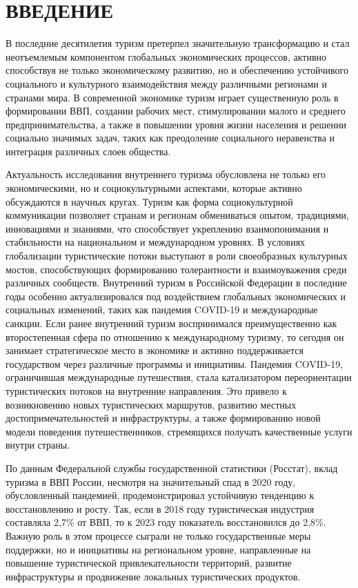 \section{ВВЕДЕНИЕ}

В последние десятилетия туризм претерпел значительную трансформацию и стал неотъемлемым компонентом глобальных экономических процессов, активно способствуя не только экономическому развитию, но и обеспечению устойчивого социального и культурного взаимодействия между различными регионами и странами мира. В современной экономике туризм играет существенную роль в формировании ВВП, создании рабочих мест, стимулировании малого и среднего предпринимательства, а также в повышении уровня жизни населения и решении социально значимых задач, таких как преодоление социального неравенства и интеграция различных слоев общества.

Актуальность исследования внутреннего туризма обусловлена не только его экономическими, но и социокультурными аспектами, которые активно обсуждаются в научных кругах. Туризм как форма социокультурной коммуникации позволяет странам и регионам обмениваться опытом, традициями, инновациями и знаниями, что способствует укреплению взаимопонимания и стабильности на национальном и международном уровнях. В условиях глобализации туристические потоки выступают в роли своеобразных культурных мостов, способствующих формированию толерантности и взаимоуважения среди различных сообществ.
Внутренний туризм в Российской Федерации в последние годы особенно актуализировался под воздействием глобальных экономических и социальных изменений, таких как пандемия COVID-19 и международные санкции. Если ранее внутренний туризм воспринимался преимущественно как второстепенная сфера по отношению к международному туризму, то сегодня он занимает стратегическое место в экономике и активно поддерживается государством через различные программы и инициативы. Пандемия COVID-19, ограничившая международные путешествия, стала катализатором переориентации туристических потоков на внутренние направления. Это привело к возникновению новых туристических маршрутов, развитию местных достопримечательностей и инфраструктуры, а также формированию новой модели поведения путешественников, стремящихся получать качественные услуги внутри страны.

По данным Федеральной службы государственной статистики (Росстат), вклад туризма в ВВП России, несмотря на значительный спад в 2020 году, обусловленный пандемией, продемонстрировал устойчивую тенденцию к восстановлению и росту. Так, если в 2018 году туристическая индустрия составляла 2,7\% от ВВП, то к 2023 году показатель восстановился до 2,8\%. Важную роль в этом процессе сыграли не только государственные меры поддержки, но и инициативы на региональном уровне, направленные на повышение туристической привлекательности территорий, развитие инфраструктуры и продвижение локальных туристических продуктов.

